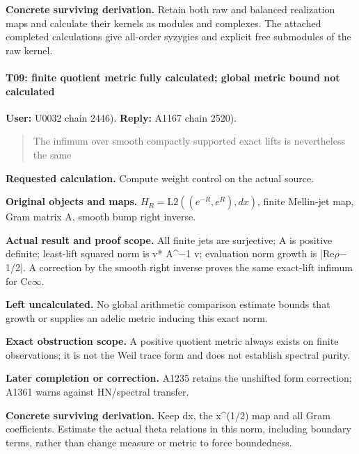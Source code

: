 \textbf{Concrete surviving derivation.} Retain both raw and balanced
realization maps and calculate their kernels as modules and complexes.
The attached completed calculations give all-order syzygies and explicit
free submodules of the raw kernel.

\paragraph{T09: finite quotient metric fully calculated; global metric
bound not
calculated}\label{t09-finite-quotient-metric-fully-calculated-global-metric-bound-not-calculated}

\textbf{User:} U0032
\protect{} chain 2446).
\textbf{Reply:} A1167
\protect{} chain 2520).

\begin{quote}
The infimum over smooth compactly supported exact lifts is nevertheless
the same
\end{quote}

\textbf{Requested calculation.} Compute weight control on the actual
source.

\textbf{Original objects and maps.} \(H_R=\text{L2}((e^{-R},e^R),dx)\),
finite Mellin-jet map, Gram matrix A, smooth bump right inverse.

\textbf{Actual result and proof scope.} All finite jets are surjective;
A is positive definite; least-lift squared norm is v*
A\textasciicircum{}\allowbreak{}\ensuremath{−}\allowbreak{}1 v;
evaluation norm growth is
|Re\allowbreak{}\ensuremath{ρ}\allowbreak{}\allowbreak{}\ensuremath{−}\allowbreak{}1/2|.
A correction by the smooth right inverse proves the same exact-lift
infimum for Cc\allowbreak{}\ensuremath{∞}\allowbreak{}.

\textbf{Left uncalculated.} No global arithmetic comparison estimate
bounds that growth or supplies an adelic metric inducing this exact
norm.

\textbf{Exact obstruction scope.} A positive quotient metric always
exists on finite observations; it is not the Weil trace form and does
not establish spectral purity.

\textbf{Later completion or correction.} A1235 retains the unshifted
form correction; A1361 warns against HN/spectral transfer.

\textbf{Concrete surviving derivation.} Keep dx, the x\^{}(1/2) map and
all Gram coefficients. Estimate the actual theta relations in this norm,
including boundary terms, rather than change measure or metric to force
boundedness.

